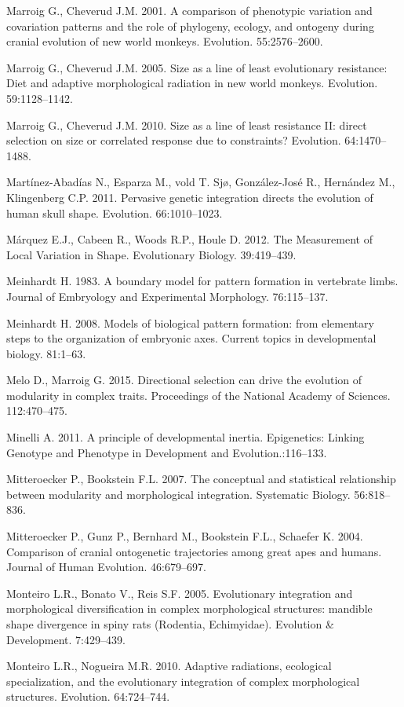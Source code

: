 \documentclass[12pt,]{article}
\begin{document}
Marroig G., Cheverud J.M. 2001. A comparison of phenotypic variation and
covariation patterns and the role of phylogeny, ecology, and ontogeny
during cranial evolution of new world monkeys. Evolution. 55:2576--2600.

Marroig G., Cheverud J.M. 2005. Size as a line of least evolutionary
resistance: Diet and adaptive morphological radiation in new world
monkeys. Evolution. 59:1128--1142.

Marroig G., Cheverud J.M. 2010. Size as a line of least resistance II:
direct selection on size or correlated response due to constraints?
Evolution. 64:1470--1488.

Martínez-Abadías N., Esparza M., vold T. Sjø, González-José R.,
Hernández M., Klingenberg C.P. 2011. Pervasive genetic integration
directs the evolution of human skull shape. Evolution. 66:1010--1023.

Márquez E.J., Cabeen R., Woods R.P., Houle D. 2012. The Measurement of
Local Variation in Shape. Evolutionary Biology. 39:419--439.

Meinhardt H. 1983. A boundary model for pattern formation in vertebrate
limbs. Journal of Embryology and Experimental Morphology. 76:115--137.

Meinhardt H. 2008. Models of biological pattern formation: from
elementary steps to the organization of embryonic axes. Current topics
in developmental biology. 81:1--63.

Melo D., Marroig G. 2015. Directional selection can drive the evolution
of modularity in complex traits. Proceedings of the National Academy of
Sciences. 112:470--475.

Minelli A. 2011. A principle of developmental inertia. Epigenetics:
Linking Genotype and Phenotype in Development and Evolution.:116--133.

Mitteroecker P., Bookstein F.L. 2007. The conceptual and statistical
relationship between modularity and morphological integration.
Systematic Biology. 56:818--836.

Mitteroecker P., Gunz P., Bernhard M., Bookstein F.L., Schaefer K. 2004.
Comparison of cranial ontogenetic trajectories among great apes and
humans. Journal of Human Evolution. 46:679--697.

Monteiro L.R., Bonato V., Reis S.F. 2005. Evolutionary integration and
morphological diversification in complex morphological structures:
mandible shape divergence in spiny rats (Rodentia, Echimyidae).
Evolution \& Development. 7:429--439.

Monteiro L.R., Nogueira M.R. 2010. Adaptive radiations, ecological
specialization, and the evolutionary integration of complex
morphological structures. Evolution. 64:724--744.
\end{document}
